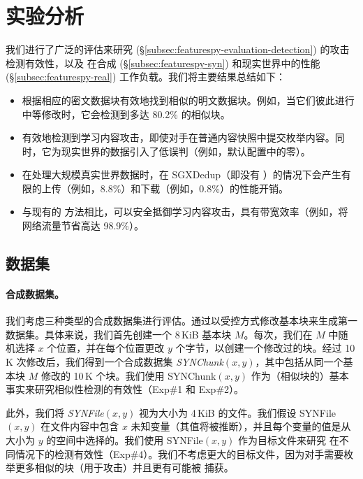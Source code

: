 \section{实验分析}
\label{sec:featurespy-evaluation}


我们进行了广泛的评估来研究 \sysnameF (\S\ref{subsec:featurespy-evaluation-detection}) 的攻击检测有效性，以及 \prototype 在合成 (\S\ref{subsec:featurespy-syn}) 和现实世界中的性能(\S\ref{subsec:featurespy-real}) 工作负载。我们将主要结果总结如下：

\begin{itemize}[leftmargin=*]
\item \sysnameF 根据相应的密文数据块有效地找到相似的明文数据块。例如，当它们彼此进行中等修改时，它会检测到多达 80.2\% 的相似块。
\item \sysnameF 有效地检测到学习内容攻击，即使对手在普通内容快照中提交枚举内容。同时，它为现实世界的数据引入了低误判（例如，默认配置中的零）。
\item \prototype 在处理大规模真实世界数据时，在 SGXDedup（即没有 \sysnameF）的情况下会产生有限的上传（例如，8.8\%）和下载（例如，0.8\%）的性能开销。
\item 与现有的 \cite{harnik10, li15} 方法相比，可以安全抵御学习内容攻击，\prototype 具有带宽效率（例如，将网络流量节省高达 98.9\%）。
\end{itemize}


\subsection{数据集}
\label{subsec:featurespy-datasets}

\paragraph*{合成数据集。}

我们考虑三种类型的合成数据集进行评估。通过以受控方式修改基本块来生成第一数据集。具体来说，我们首先创建一个 8\,KiB 基本块 $M$。每次，我们在 $M$ 中随机选择 $x$ 个位置，并在每个位置更改 $y$ 个字节，以创建一个修改过的块。经过 10\,K 次修改后，我们得到一个合成数据集 {\em SYNChunk}$(x, y)$，其中包括从同一个基本块 $M$ 修改的 10\,K 个块。我们使用 SYNChunk$(x, y)$ 作为（相似块的）基本事实来研究相似性检测的有效性（Exp\#1 和 Exp\#2）。

此外，我们将 {\em SYNFile}$(x, y)$ 视为大小为 4\,KiB 的文件。我们假设 SYNFile$(x, y)$ 在文件内容中包含 $x$ 未知变量（其值将被推断），并且每个变量的值是从大小为 $y$ 的空间中选择的。我们使用 SYNFile$(x, y)$ 作为目标文件来研究 \sysnameF 在不同情况下的检测有效性（Exp\#4）。我们不考虑更大的目标文件，因为对手需要枚举更多相似的块（用于攻击）并且更有可能被 \sysnameF 捕获。

